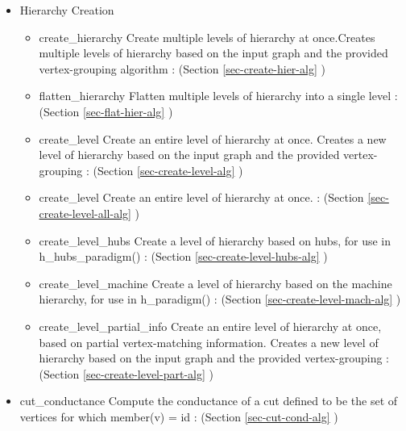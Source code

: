 \begin{itemize}
\item
Hierarchy Creation
\begin{itemize}
\item
create\_hierarchy 
\newline
Create multiple levels of hierarchy at once.Creates multiple levels of hierarchy based on the input graph and the provided vertex-grouping algorithm
 : (Section \ref{sec-create-hier-alg} )
\item
flatten\_hierarchy 
\newline
Flatten multiple levels of hierarchy into a single level
 : (Section \ref{sec-flat-hier-alg} )
\item
create\_level 
\newline
Create an entire level of hierarchy at once.  Creates a new level of hierarchy based on the input graph and the provided vertex-grouping
 : (Section \ref{sec-create-level-alg} )
\item
create\_level 
\newline
Create an entire level of hierarchy at once.
 : (Section \ref{sec-create-level-all-alg} )
\item
create\_level\_hubs 
\newline
Create a level of hierarchy based on hubs, for use in h\_hubs\_paradigm()
 : (Section \ref{sec-create-level-hubs-alg} )
\item
create\_level\_machine 
\newline
Create a level of hierarchy based on the machine hierarchy, for use in h\_paradigm()
 : (Section \ref{sec-create-level-mach-alg} )
\item
create\_level\_partial\_info 
\newline
Create an entire level of hierarchy at once, based on partial vertex-matching information.  Creates a new level of hierarchy based on the input graph and the provided vertex-grouping
 : (Section \ref{sec-create-level-part-alg} )
\end{itemize}


\item
cut\_conductance 
\newline
Compute the conductance of a cut defined to be the set of vertices for which member(v) = id
 : (Section \ref{sec-cut-cond-alg} )


\end{itemize}
